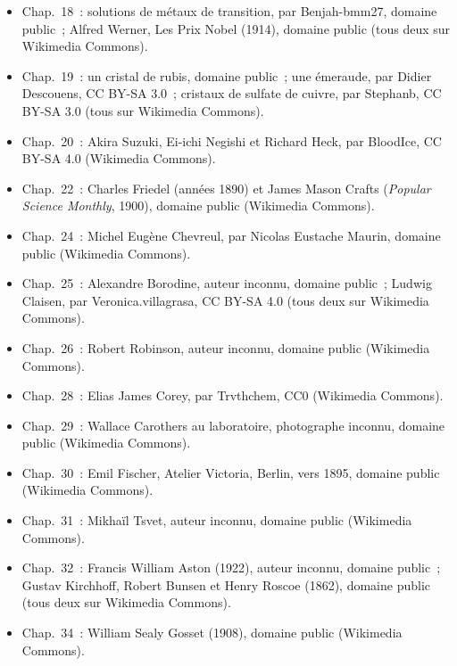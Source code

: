 \begin{itemize}
        (Wikimedia Commons).
  \item Chap.~18~: solutions de métaux de transition, par Benjah-bmm27,
        domaine public~; Alfred Werner, Les Prix Nobel (1914), domaine
        public (tous deux sur Wikimedia Commons).
  \item Chap.~19~: un cristal de rubis, domaine public~; une émeraude, par
        Didier Descouens, CC BY-SA 3.0~; cristaux de sulfate de cuivre, par
        Stephanb, CC BY-SA 3.0 (tous sur Wikimedia Commons).
  \item Chap.~20~: Akira Suzuki, Ei-ichi Negishi et Richard Heck, par
        BloodIce, CC BY-SA 4.0 (Wikimedia Commons).
  \item Chap.~22~: Charles Friedel (années 1890) et James Mason Crafts
        (\textit{Popular Science Monthly}, 1900), domaine public (Wikimedia
        Commons).
  \item Chap.~24~: Michel Eugène Chevreul, par Nicolas Eustache Maurin,
        domaine public (Wikimedia Commons).
  \item Chap.~25~: Alexandre Borodine, auteur inconnu, domaine public~;
        Ludwig Claisen, par Veronica.villagrasa, CC BY-SA 4.0 (tous deux sur
        Wikimedia Commons).
  \item Chap.~26~: Robert Robinson, auteur inconnu, domaine public
        (Wikimedia Commons).
  \item Chap.~28~: Elias James Corey, par Trvthchem, CC0 (Wikimedia
        Commons).
  \item Chap.~29~: Wallace Carothers au laboratoire, photographe inconnu,
        domaine public (Wikimedia Commons).
  \item Chap.~30~: Emil Fischer, Atelier Victoria, Berlin, vers 1895,
        domaine public (Wikimedia Commons).
  \item Chap.~31~: Mikhaïl Tsvet, auteur inconnu, domaine public
        (Wikimedia Commons).
  \item Chap.~32~: Francis William Aston (1922), auteur inconnu, domaine
        public~; Gustav Kirchhoff, Robert Bunsen et Henry Roscoe (1862),
        domaine public (tous deux sur Wikimedia Commons).
  \item Chap.~34~: William Sealy Gosset (1908), domaine public (Wikimedia
        Commons).
\end{itemize}
\clearpage
